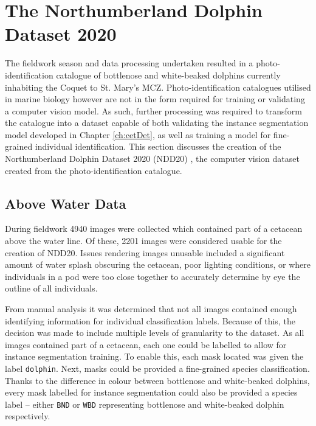 \section{The Northumberland Dolphin Dataset 2020}\label{ch:NDD,sec:NDD20}

The fieldwork season and data processing undertaken resulted in a photo-identification catalogue of bottlenose and white-beaked dolphins currently inhabiting the Coquet to St. Mary's MCZ. Photo-identification catalogues utilised in marine biology however are not in the form required for training or validating a computer vision model. As such, further processing was required to transform the catalogue into a dataset capable of both validating the instance segmentation model developed in Chapter \ref{ch:cetDet}, as well as training a model for fine-grained individual identification. This section discusses the creation of the Northumberland Dolphin Dataset 2020 (NDD20) \cite{trotter_ndd20_2020}, the computer vision dataset created from the photo-identification catalogue.

\subsection{Above Water Data}\label{ch:NDD,sec:NDD20,sub:aboveWaterData}

During fieldwork 4940 images were collected which contained part of a cetacean above the water line. Of these, 2201 images were considered usable for the creation of NDD20. Issues rendering images unusable included a significant amount of water splash obscuring the cetacean, poor lighting conditions, or where individuals in a pod were too close together to accurately determine by eye the outline of all individuals. 

From manual analysis it was determined that not all images contained enough identifying information for individual classification labels. Because of this, the decision was made to include multiple levels of granularity to the dataset. As all images contained part of a cetacean, each one could be labelled to allow for instance segmentation training. To enable this, each mask located was given the label \texttt{dolphin}. Next, masks could be provided a fine-grained species classification. Thanks to the difference in colour between bottlenose and white-beaked dolphins, every mask labelled for instance segmentation could also be provided a species label -- either \texttt{BND} or \texttt{WBD} representing bottlenose and white-beaked dolphin respectively. 

